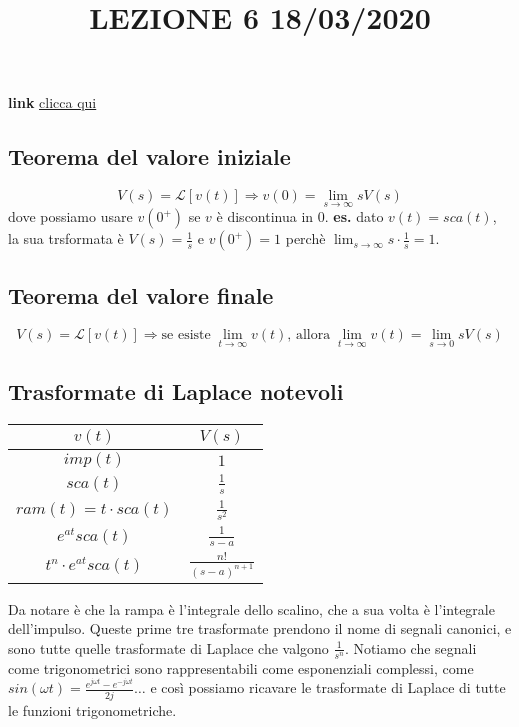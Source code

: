 \title{LEZIONE 6 18/03/2020}\newline
\textbf{link} \href{https://web.microsoftstream.com/video/0c2093a0-44b9-4c83-a0b1-7e61fbd111b5?list=user&userId=faa91214-a6f5-40d7-8875-253fd49b8ce1}{clicca qui}
\subsection{Teorema del valore iniziale}
\[
    V(s) = \mathcal{L}[v(t)] \Longrightarrow v(0) = \lim_{s\rightarrow \infty}s V(s)
\] 
dove possiamo usare $v(0^+)$ se $v$ è discontinua in $0$.\newline
\newline
\textbf{es.} dato $v(t) = sca(t)$, la sua trsformata è $V(s) = \frac{1}{s}$ e $v(0^+) = 1$ perchè $\lim_{s\rightarrow \infty}s \cdot \frac{1}{s} = 1$.
\subsection{Teorema del valore finale}
\[
    V(s) = \mathcal{L}[v(t)] \Longrightarrow \text{se esiste}\; \lim_{t\rightarrow \infty} v(t) \text{, allora}\;\lim_{t\rightarrow \infty} v(t) = \lim_{s\rightarrow 0}sV(s)
\]
\subsection{Trasformate di Laplace notevoli}
\renewcommand{\arraystretch}{2}
\begin{center}
    \begin{tabular}{ |c|c| } 
     \hline
     \;\;\;\;\;\;\;\;\;\;\;\;\;\;\;$v(t)$ \;\;\;\;\;\;\;\;\;\;\;\;\;\;\;& \;\;\;\;\;\;\;\;\;\;\;\;\;\;\;$V(s)$ \;\;\;\;\;\;\;\;\;\;\;\;\;\;\;\\ 
     \hline
     $imp(t)$ & $1$ \\ 
     $sca(t)$ & $\frac{1}{s}$  \\ 
     $ram(t) = t \cdot  sca(t)$ & $\frac{1}{s^2}$ \\
     $e^{at}sca(t)$ & $\frac{1}{s-a}$ \\ 
     $t^{n}\cdot e^{at}sca(t)$ & $\frac{n!}{(s-a)^{n+1}}$\\ 
     \hline
    \end{tabular}
\end{center}
\renewcommand{\arraystretch}{1}
Da notare è che la rampa è l'integrale dello scalino, che a sua volta è l'integrale dell'impulso.\newline
Queste prime tre trasformate prendono il nome di segnali canonici, e sono tutte quelle trasformate di Laplace che valgono $\frac{1}{s^n}$.\newline
Notiamo che segnali come trigonometrici sono rappresentabili come esponenziali complessi, come $sin(\omega t) = \frac{e^{j \omega t}- e^{-j \omega t}}{2j} \dots$ e così possiamo ricavare le trasformate di Laplace di tutte le funzioni trigonometriche.
